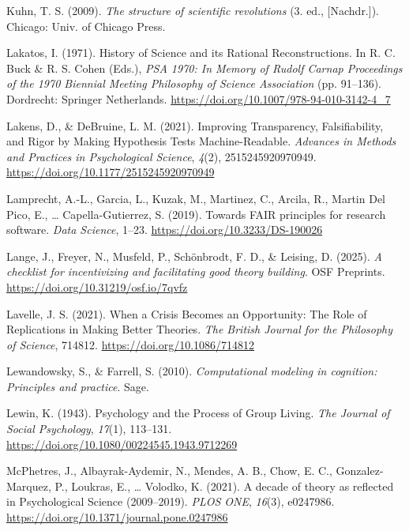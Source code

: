 \documentclass[
  man,floatsintext]{apa6}
\newlength{\cslhangindent}
\newenvironment{CSLReferences}[2] %
 {\begin{list}{}{%
  \setlength{\itemindent}{0pt}
  \setlength{\leftmargin}{0pt}
  \setlength{\parsep}{0pt}
  \ifodd #1
   \setlength{\leftmargin}{\cslhangindent}
   \setlength{\itemindent}{-1\cslhangindent}
  \fi
  \setlength{\itemsep}{#2\baselineskip}}}
 {\end{list}}
\begin{document}
\begin{CSLReferences}{1}{0}
Kuhn, T. S. (2009). \emph{The structure of scientific revolutions} (3. ed., {[}Nachdr.{]}). Chicago: Univ. of Chicago Press.

Lakatos, I. (1971). History of {Science} and its {Rational Reconstructions}. In R. C. Buck \& R. S. Cohen (Eds.), \emph{{PSA} 1970: {In Memory} of {Rudolf Carnap Proceedings} of the 1970 {Biennial Meeting Philosophy} of {Science Association}} (pp. 91--136). Dordrecht: Springer Netherlands. \url{https://doi.org/10.1007/978-94-010-3142-4_7}

Lakens, D., \& DeBruine, L. M. (2021). Improving {Transparency}, {Falsifiability}, and {Rigor} by {Making Hypothesis Tests Machine-Readable}. \emph{Advances in Methods and Practices in Psychological Science}, \emph{4}(2), 2515245920970949. \url{https://doi.org/10.1177/2515245920970949}

Lamprecht, A.-L., Garcia, L., Kuzak, M., Martinez, C., Arcila, R., Martin Del Pico, E., \ldots{} Capella-Gutierrez, S. (2019). Towards {FAIR} principles for research software. \emph{Data Science}, 1--23. \url{https://doi.org/10.3233/DS-190026}

Lange, J., Freyer, N., Musfeld, P., Schönbrodt, F. D., \& Leising, D. (2025). \emph{A checklist for incentivizing and facilitating good theory building}. OSF Preprints. \url{https://doi.org/10.31219/osf.io/7qvfz}

Lavelle, J. S. (2021). When a {Crisis Becomes} an {Opportunity}: {The Role} of {Replications} in {Making Better Theories}. \emph{The British Journal for the Philosophy of Science}, 714812. \url{https://doi.org/10.1086/714812}

Lewandowsky, S., \& Farrell, S. (2010). \emph{Computational modeling in cognition: {Principles} and practice}. Sage.

Lewin, K. (1943). Psychology and the {Process} of {Group Living}. \emph{The Journal of Social Psychology}, \emph{17}(1), 113--131. \url{https://doi.org/10.1080/00224545.1943.9712269}

McPhetres, J., Albayrak-Aydemir, N., Mendes, A. B., Chow, E. C., Gonzalez-Marquez, P., Loukras, E., \ldots{} Volodko, K. (2021). A decade of theory as reflected in {Psychological Science} (2009--2019). \emph{PLOS ONE}, \emph{16}(3), e0247986. \url{https://doi.org/10.1371/journal.pone.0247986}


\end{CSLReferences}
\end{document}
